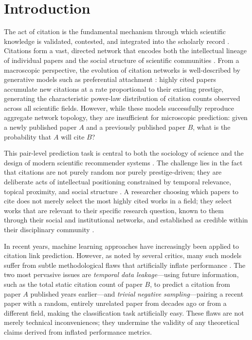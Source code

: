 \documentclass[12pt,a4paper]{article}
\begin{document}
\newpage
\tableofcontents
\newpage

\section{Introduction}
\label{sec:intro}

The act of citation is the fundamental mechanism through which scientific knowledge
is validated, contested, and integrated into the scholarly record
\citep{merton1968matthew, price1965networks}. Citations form a vast, directed
network that encodes both the intellectual lineage of individual papers and the
social structure of scientific communities \citep{fortunato2018science}. From a
macroscopic perspective, the evolution of citation networks is well-described by
generative models such as preferential attachment \citep{barabasi1999emergence,
de2000preferential}: highly cited papers accumulate new citations at a rate
proportional to their existing prestige, generating the characteristic power-law
distribution of citation counts observed across all scientific fields. However,
while these models successfully reproduce aggregate network topology, they are
insufficient for microscopic prediction: given a newly published paper $A$ and a
previously published paper $B$, what is the probability that $A$ will cite $B$?

This pair-level prediction task is central to both the sociology of science and the
design of modern scientific recommender systems \citep{shibata2012link,
bhagavatula2018content}. The challenge lies in the fact that citations are not
purely random nor purely prestige-driven; they are deliberate acts of intellectual
positioning constrained by temporal relevance, topical proximity, and social
structure \citep{kuhn1962structure, bornmann2008what}. A researcher choosing which
papers to cite does not merely select the most highly cited works in a field; they
select works that are relevant to their specific research question, known to them
through their social and institutional networks, and established as credible within
their disciplinary community \citep{crane1972invisible}.

In recent years, machine learning approaches have increasingly been applied to
citation link prediction. However, as noted by several critics, many such models
suffer from subtle methodological flaws that artificially inflate performance
\citep{wang2013quantifying}. The two most pervasive issues are \textit{temporal
data leakage}---using future information, such as the total static citation count
of paper $B$, to predict a citation from paper $A$ published years earlier---and
\textit{trivial negative sampling}---pairing a recent paper with a random, entirely
unrelated paper from decades ago or from a different field, making the classification
task artificially easy. These flaws are not merely technical inconveniences; they
undermine the validity of any theoretical claims derived from inflated performance
metrics.
\end{document}

